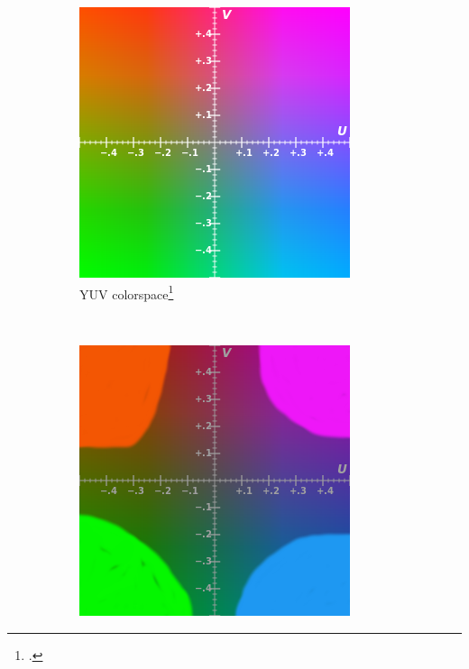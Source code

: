 \begin{savenotes}
\begin{figure}
        \centering
        \begin{subfigure}[b]{0.3\textwidth}
                \centering
                \includegraphics[width=\textwidth]{img/YUV.png}
                \caption[YUV colorspace]{YUV colorspace\footcite[][]{yuv_img}}
                \label{fig:yuv_normal}
        \end{subfigure}%
        ~ %
        \begin{subfigure}[b]{0.3\textwidth}
                \centering
                \includegraphics[width=\textwidth]{img/YUV_LUT.png}

\end{subfigure}
\end{figure}
\end{savenotes}

